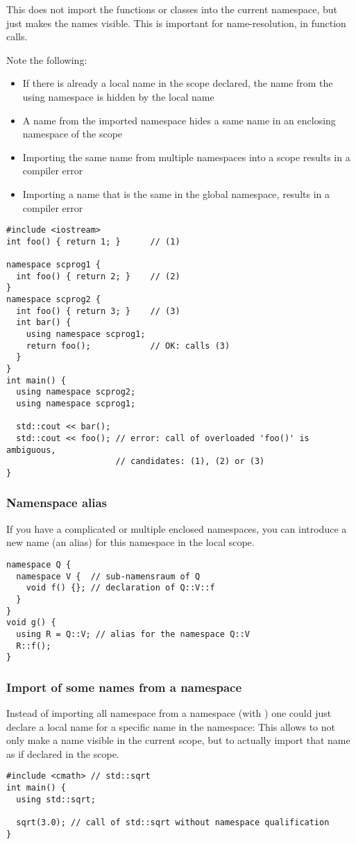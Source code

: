 This does not import the functions or classes into the current namespace, but just makes the names visible. This is important for name-resolution, \eg
in function calls.

Note the following:
\begin{itemize}
\item If there is already a local name in the scope declared, the name from the using namespace is hidden by the local name
\item A name from the imported namespace hides a same name in an enclosing namespace of the scope
\item Importing the same name from multiple namespaces into a scope results in a compiler error
\item Importing a name that is the same in the global namespace, results in a compiler error
\end{itemize}

\begin{verbatim}
#include <iostream>
int foo() { return 1; }      // (1)

namespace scprog1 {
  int foo() { return 2; }    // (2)
}
namespace scprog2 {
  int foo() { return 3; }    // (3)
  int bar() {
    using namespace scprog1;
    return foo();            // OK: calls (3)
  }
}
int main() {
  using namespace scprog2;
  using namespace scprog1;

  std::cout << bar();
  std::cout << foo(); // error: call of overloaded 'foo()' is ambiguous,
                      // candidates: (1), (2) or (3)
}
\end{verbatim}

\subsubsection{Namenspace alias}
If you have a complicated or multiple enclosed namespaces, you can introduce a new name (an alias) for this namespace in the local scope.
%
\begin{verbatim}
namespace Q {
  namespace V {  // sub-namensraum of Q
    void f() {}; // declaration of Q::V::f
  }
}
void g() {
  using R = Q::V; // alias for the namespace Q::V
  R::f();
}
\end{verbatim}

\subsubsection{Import of some names from a namespace}
Instead of importing all namespace from a namespace (with ) one could just declare a local name for a specific name in the namespace:
This allows to not only make a name visible in the current scope, but to actually import that name as if declared in the scope.
%
\begin{verbatim}
#include <cmath> // std::sqrt
int main() {
  using std::sqrt;

  sqrt(3.0); // call of std::sqrt without namespace qualification
}
\end{verbatim}

